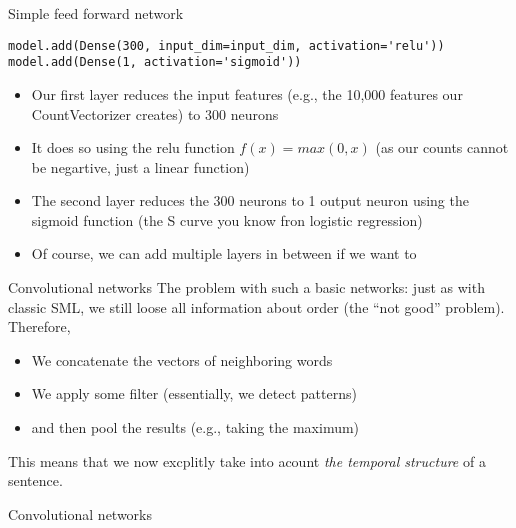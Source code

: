 \begin{frame}[fragile]{Simple feed forward network}
\begin{lstlisting}
model.add(Dense(300, input_dim=input_dim, activation='relu'))
model.add(Dense(1, activation='sigmoid'))
\end{lstlisting}	
	
\begin{itemize}[<+->]
\item Our first layer reduces the input features (e.g., the 10,000 features our CountVectorizer creates) to 300 neurons
\item It does so using the relu function $f(x) = max(0, x)$ (as our counts cannot be negartive, just a linear function)
\item The second layer reduces the 300 neurons to 1 output neuron using the sigmoid function (the S curve you know fron logistic regression)
\item Of course, we can add multiple layers in between if we want to
\end{itemize}
\end{frame}





\begin{frame}{Convolutional networks}
  The problem with such a basic networks: just as with classic SML, we still loose all information about order (the ``not good'' problem).
  Therefore,
  \begin{itemize}
  \item We concatenate the vectors of neighboring words
  \item We apply some filter (essentially, we detect patterns)
  \item and then pool the results (e.g., taking the maximum)
  \end{itemize}
  This means that we now excplitly take into acount \emph{the temporal structure} of a sentence.
\end{frame}



\begin{frame}{Convolutional networks}
\end{frame}



